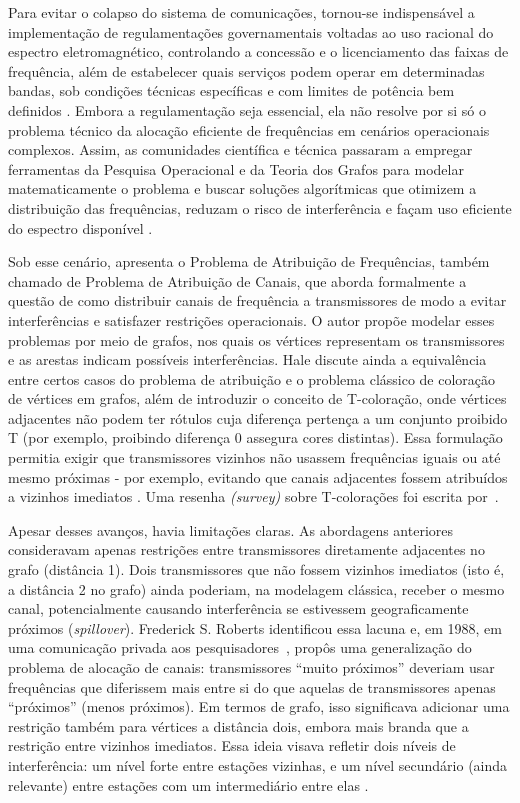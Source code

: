 Para evitar o colapso do sistema de comunicações, tornou-se indispensável a implementação de regulamentações governamentais voltadas ao uso racional do espectro eletromagnético, controlando a concessão e o licenciamento das faixas de frequência, além de estabelecer quais serviços podem operar em determinadas bandas, sob condições técnicas específicas e com limites de potência bem definidos \cite{pinheiro2015regulaccao}. Embora a regulamentação seja essencial, ela não resolve por si só o problema técnico da alocação eficiente de frequências em cenários operacionais complexos. Assim, as comunidades científica e técnica passaram a empregar ferramentas da Pesquisa Operacional e da Teoria dos Grafos para modelar matematicamente o problema e buscar soluções algorítmicas que otimizem a distribuição das frequências, reduzam o risco de interferência e façam uso eficiente do espectro disponível \cite{metzger1970spectrum}.

Sob esse cenário,  apresenta o Problema de Atribuição de Frequências, também chamado de Problema de Atribuição de Canais, que aborda formalmente a questão de como distribuir canais de frequência a transmissores de modo a evitar interferências e satisfazer restrições operacionais. O autor propõe modelar esses problemas por meio de grafos, nos quais os vértices representam os transmissores e as arestas indicam possíveis interferências. Hale discute ainda a equivalência entre certos casos do problema de atribuição e o problema clássico de coloração de vértices em grafos, além de introduzir o conceito de T-coloração, onde vértices adjacentes não podem ter rótulos cuja diferença pertença a um conjunto proibido T (por exemplo, proibindo diferença 0 assegura cores distintas). Essa formulação permitia exigir que transmissores vizinhos não usassem frequências iguais ou até mesmo próximas - por exemplo, evitando que canais adjacentes fossem atribuídos a vizinhos imediatos \cite{LIU1992203, doi:10.1142/S1793830921501032}. Uma resenha \emph{(survey)} sobre T-colorações foi escrita por~.

Apesar desses avanços, havia  limitações claras. As abordagens anteriores consideravam apenas restrições entre transmissores diretamente adjacentes no grafo (distância 1). Dois transmissores que não fossem vizinhos imediatos (isto é, a distância 2 no grafo) ainda poderiam, na modelagem clássica, receber o mesmo canal, potencialmente causando interferência se estivessem geograficamente próximos (\textit{spillover}). Frederick S. Roberts identificou essa lacuna e, em 1988, em uma comunicação privada aos pesquisadores~, propôs uma generalização do problema de alocação de canais: transmissores “muito próximos” deveriam usar frequências que diferissem mais entre si do que aquelas de transmissores apenas “próximos” (menos próximos). Em termos de grafo, isso significava adicionar uma restrição também para vértices a distância dois, embora mais branda que a restrição entre vizinhos imediatos. Essa ideia visava refletir dois níveis de interferência: um nível forte entre estações vizinhas, e um nível secundário (ainda relevante) entre estações com um intermediário entre elas \cite{franks2015delta2}.

